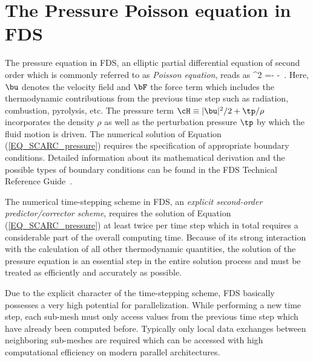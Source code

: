 \section{The Pressure Poisson equation in FDS}
\label{SEC_SCARC_poisson}

The pressure equation in FDS, an elliptic partial differential equation of second order which is commonly referred to as {\it Poisson equation}, reads as
\be 
  \nabla^2 \cH =- - \nabla \cdot \bF\,.
  \label{EQ_SCARC_pressure}
\ee
Here, $\bu$ denotes the velocity field and $\bF$ the force term which includes the thermodynamic contributions from the previous time step such as radiation, combustion, pyrolysis, etc.  
The pressure term $\cH \equiv |\bu|^2/2 + \tp/\rho$ incorporates the density $\rho$ as well as the perturbation pressure $\tp$ by which the fluid motion is driven. The numerical solution of Equation (\ref{EQ_SCARC_pressure}) requires the specification of appropriate boundary conditions. Detailed information about its mathematical derivation and the possible types of boundary conditions can be found in the FDS Technical Reference Guide~\cite{McGrattan:2018:TG}.

The numerical time-stepping scheme in FDS, an {\it explicit second-order predictor/corrector scheme}, requires the solution of Equation (\ref{EQ_SCARC_pressure}) at least twice per time step which in total requires a considerable part of the overall computing time.
Because of its strong interaction with the calculation of all other thermodynamic quantities, the solution of the pressure equation is an essential step in the entire solution process and must be treated as efficiently and accurately as possible.

Due to the explicit character of the time-stepping scheme, FDS basically possesses a very high potential for parallelization.
While performing a new time step, each sub-mesh must only access values from the previous time step which have already been computed before. Typically only local data exchanges between neighboring sub-meshes are required which can be accessed with high computational efficiency on modern parallel architectures. 




